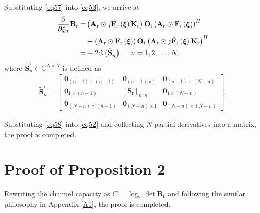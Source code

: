 \documentclass[lettersize,journal]{IEEEtran}
\begin{document}
Substituting \eqref{eq57} into \eqref{eq53}, we arrive at
\begin{align}\label{eq58}
 \frac{\partial }{\partial \xi_{n}}\mathbf{B}_{\textrm{r}}=&\left ( \mathbf{A}_{\textrm{r}}\odot j\tilde{\mathbf{F}}_{\textrm{r}}\left ( \boldsymbol{\xi} \right )\mathbf{K}_{\textrm{r}} \right )\mathbf{O}_{\textrm{t}}\left ( \mathbf{A}_{\textrm{r}}\odot \mathbf{F}_{\textrm{r}}\left ( \boldsymbol{\xi} \right ) \right ) ^{H}\notag\\
&+\left ( \mathbf{A}_{\textrm{r}}\odot \mathbf{F}_{\textrm{r}}\left ( \boldsymbol{\xi} \right ) \right )\mathbf{O}_{\textrm{t}}\left ( \mathbf{A}_{\textrm{r}}\odot j\tilde{\mathbf{F}}_{\textrm{r}}\left ( \boldsymbol{\xi} \right )\mathbf{K}_{\textrm{r}} \right )^{H}\notag\\
=&-2\Im \left ( \tilde{\mathbf{S}}_{n}^{\textrm{r}} \right ),\quad n=1,2,\ldots,N,
\end{align}
where $\tilde{\mathbf{S}}_{n}^{\textrm{r}}\in \mathbb{C}^{N\times N}$ is defined as
\begin{align}
 \tilde{\mathbf{S}}_{n}^{\textrm{r}} = \begin{bmatrix}
 \boldsymbol{0}_{\left ( n-1 \right )\times \left ( n-1 \right )}& \mathbf{0}_{\left ( n-1 \right )\times 1} & \mathbf{0}_{\left ( n-1 \right )\times \left ( N-n \right )}\\ 
\mathbf{0}_{1\times \left ( n-1 \right )} & \left [ \mathbf{S}_{\textrm{r}} \right ]_{n,n} & \mathbf{0}_{1\times \left ( N-n \right )}\\ 
\mathbf{0}_{\left ( N-n \right )\times \left ( n-1 \right )} & \mathbf{0}_{\left ( N-n \right )\times 1} & \mathbf{0}_{\left ( N-n \right )\times \left ( N-n \right )}
\end{bmatrix}.
\end{align}

Substituting \eqref{eq58} into \eqref{eq52} and collecting $N$ partial derivatives into a matrix, the proof is completed.
\section{Proof of Proposition 2}\label{A2}
Rewriting the channel capacity as $C = \log_{2}\det \mathbf{B}_{\textrm{t}}$ and following the similar philosophy in Appendix \ref{A1}, the proof is completed.



\end{document}
